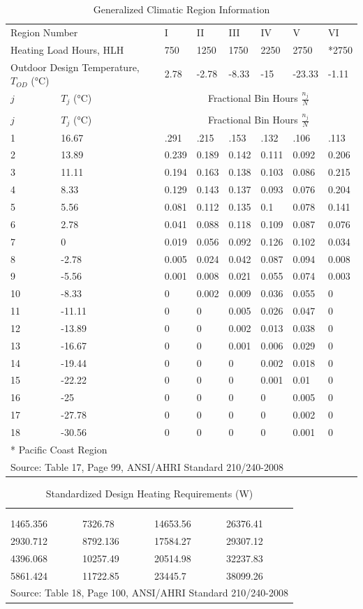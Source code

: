 \begin{longtable}[c]{p{0.75in}p{0.75in}p{0.75in}p{0.75in}p{0.75in}p{0.75in}p{0.75in}p{0.75in}}
\caption{Generalized Climatic Region Information \label{table:generalized-climatic-region-information}} \tabularnewline
\toprule
\multicolumn{2}{p{1.5in}}{\raggedright Region Number} & I & II & III & IV & V & VI \tabularnewline
\multicolumn{2}{p{1.5in}}{\raggedright Heating Load Hours, HLH} & 750 & 1250 & 1750 & 2250 & 2750 & *2750 \tabularnewline
\multicolumn{2}{p{1.5in}}{\raggedright Outdoor Design Temperature, \(T_{OD}\) (°C)} & 2.78 & -2.78 & -8.33 & -15 & -23.33 & -1.11 \tabularnewline
\midrule
\(j\) & \(T_j\) (°C) & \multicolumn{6}{c}{Fractional Bin Hours \(\frac{n_j}{N}\)} \tabularnewline
\midrule
\endfirsthead

\caption[]{Generalized Climatic Region Information} \tabularnewline
\toprule
\(j\) & \(T_j\) (°C) & \multicolumn{6}{c}{Fractional Bin Hours \(\frac{n_j}{N}\)} \tabularnewline
\midrule
\endhead

1 & 16.67 & .291 & .215 & .153 & .132 & .106 & .113 \tabularnewline
2 & 13.89 & 0.239 & 0.189 & 0.142 & 0.111 & 0.092 & 0.206 \tabularnewline
3 & 11.11 & 0.194 & 0.163 & 0.138 & 0.103 & 0.086 & 0.215 \tabularnewline
4 & 8.33 & 0.129 & 0.143 & 0.137 & 0.093 & 0.076 & 0.204 \tabularnewline
5 & 5.56 & 0.081 & 0.112 & 0.135 & 0.1 & 0.078 & 0.141 \tabularnewline
6 & 2.78 & 0.041 & 0.088 & 0.118 & 0.109 & 0.087 & 0.076 \tabularnewline
7 & 0 & 0.019 & 0.056 & 0.092 & 0.126 & 0.102 & 0.034 \tabularnewline
8 & -2.78 & 0.005 & 0.024 & 0.042 & 0.087 & 0.094 & 0.008 \tabularnewline
9 & -5.56 & 0.001 & 0.008 & 0.021 & 0.055 & 0.074 & 0.003 \tabularnewline
10 & -8.33 & 0 & 0.002 & 0.009 & 0.036 & 0.055 & 0 \tabularnewline
11 & -11.11 & 0 & 0 & 0.005 & 0.026 & 0.047 & 0 \tabularnewline
12 & -13.89 & 0 & 0 & 0.002 & 0.013 & 0.038 & 0 \tabularnewline
13 & -16.67 & 0 & 0 & 0.001 & 0.006 & 0.029 & 0 \tabularnewline
14 & -19.44 & 0 & 0 & 0 & 0.002 & 0.018 & 0 \tabularnewline
15 & -22.22 & 0 & 0 & 0 & 0.001 & 0.01 & 0 \tabularnewline
16 & -25 & 0 & 0 & 0 & 0 & 0.005 & 0 \tabularnewline
17 & -27.78 & 0 & 0 & 0 & 0 & 0.002 & 0 \tabularnewline
18 & -30.56 & 0 & 0 & 0 & 0 & 0.001 & 0 \tabularnewline
\bottomrule
\multicolumn{8}{l}{* Pacific Coast Region} \tabularnewline
\multicolumn{8}{l}{Source: Table 17, Page 99, ANSI/AHRI Standard 210/240-2008}
\end{longtable}

\begin{longtable}[c]{p{1.5in}p{1.5in}p{1.5in}p{1.5in}}
\caption{Standardized Design Heating Requirements (W) \label{table:standardized-design-heating-requirements-w}} \tabularnewline
\toprule
\tabularnewline
\endfirsthead

\caption[]{Standardized Design Heating Requirements (W)} \tabularnewline
\toprule
\tabularnewline
\endhead

1465.356 & 7326.78 & 14653.56 & 26376.41 \tabularnewline
2930.712 & 8792.136 & 17584.27 & 29307.12 \tabularnewline
4396.068 & 10257.49 & 20514.98 & 32237.83 \tabularnewline
5861.424 & 11722.85 & 23445.7 & 38099.26 \tabularnewline
\bottomrule
\multicolumn{4}{l}{Source: Table 18, Page 100, ANSI/AHRI Standard 210/240-2008}
\end{longtable}

